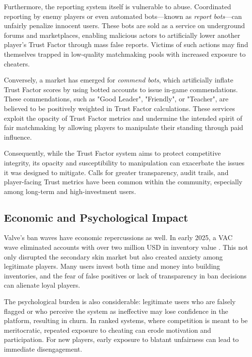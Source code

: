 Furthermore, the reporting system itself is vulnerable to abuse. Coordinated reporting by enemy players or even automated bots—known as \textit{report bots}—can unfairly penalize innocent users. These bots are sold as a service on underground forums and marketplaces, enabling malicious actors to artificially lower another player's Trust Factor through mass false reports. Victims of such actions may find themselves trapped in low-quality matchmaking pools with increased exposure to cheaters.

Conversely, a market has emerged for \textit{commend bots}, which artificially inflate Trust Factor scores by using botted accounts to issue in-game commendations. These commendations, such as "Good Leader", "Friendly", or "Teacher", are believed to be positively weighted in Trust Factor calculations. These services exploit the opacity of Trust Factor metrics and undermine the intended spirit of fair matchmaking by allowing players to manipulate their standing through paid influence.

Consequently, while the Trust Factor system aims to protect competitive integrity, its opacity and susceptibility to manipulation can exacerbate the issues it was designed to mitigate. Calls for greater transparency, audit trails, and player-facing Trust metrics have been common within the community, especially among long-term and high-investment users.

\subsection{Economic and Psychological Impact}

Valve's ban waves have economic repercussions as well. In early 2025, a VAC wave eliminated accounts with over two million USD in inventory value \cite{ggscore2025vacban}. This not only disrupted the secondary skin market but also created anxiety among legitimate players. Many users invest both time and money into building inventories, and the fear of false positives or lack of transparency in ban decisions can alienate loyal players.

The psychological burden is also considerable: legitimate users who are falsely flagged or who perceive the system as ineffective may lose confidence in the platform, resulting in churn. In ranked systems, where competition is meant to be meritocratic, repeated exposure to cheating can erode motivation and participation. For new players, early exposure to blatant unfairness can lead to immediate disengagement.

